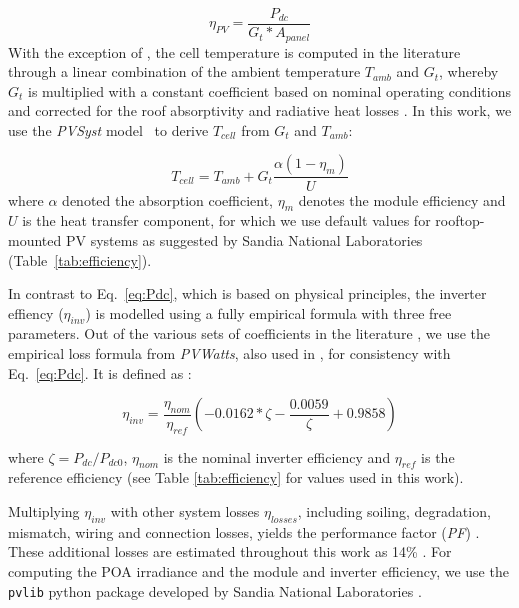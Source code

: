 \begin{equation}
\label{eq:eff}
    \eta_{PV} = \frac{P_{dc}}{G_{t} * A_\mathit{panel} }
\end{equation}
With the exception of \cite{calcabrini_simplified_2019}, the cell temperature is computed in the literature through a linear combination of the ambient temperature $T_\mathit{amb}$ and $G_t$, whereby $G_t$ is multiplied with a constant coefficient based on nominal operating conditions and corrected for the roof absorptivity and radiative heat losses \cite{jakubiec_method_2013}.
%
In this work, we use the \textit{PVSyst} model~\cite{faiman_assessing_2008} to derive $T_{cell}$ from $G_t$ and $T_\mathit{amb}$:

\begin{equation}
    T_\mathit{cell} = T_\mathit{amb} + G_t \frac{\alpha (1 - \eta_m)}{U}
\end{equation}
where $\alpha$ denoted the absorption coefficient, $\eta_m$ denotes the module efficiency and $U$ is the heat transfer component, for which we use default values for rooftop-mounted PV systems as suggested by Sandia National Laboratories \cite{holmgren_pvlib_2018} (Table~\ref{tab:efficiency}).

In contrast to Eq.~\ref{eq:Pdc}, which is based on physical principles, the inverter effiency ($\eta_\mathit{inv}$) is modelled using a fully empirical formula with three free parameters. Out of the various sets of coefficients in the literature \cite{mainzer_assessment_2017,lukac_buildings_2014}, we use the empirical loss formula from \textit{PVWatts}, also used in \cite{buffat_scalable_2018}, for consistency with Eq.~\ref{eq:Pdc}. It is defined as \cite{dobos_pvwatts_2014}:

\begin{equation}
\label{eq:inv}
    \eta_{inv} = \frac{\eta_{nom}}{\eta_{ref}} \left( -0.0162 * \zeta - \frac{0.0059}{\zeta} + 0.9858 \right)
\end{equation}

where $\zeta = P_{dc}/P_{dc0}$, $\eta_{nom}$ is the nominal inverter efficiency and $\eta_{ref}$ is the reference efficiency (see Table \ref{tab:efficiency} for values used in this work). 
%

Multiplying  $\eta_{inv}$ with other system losses $\eta_\mathit{losses}$, including soiling, degradation, mismatch, wiring and connection losses, yields the performance factor (\textit{PF}) \cite{klauser_solarpotentialanalyse_2016}. 
These additional losses are estimated throughout this work as 14\% \cite{dobos_pvwatts_2014}. For computing the POA irradiance and the module and inverter efficiency, we use the \texttt{pvlib} python package developed by Sandia National Laboratories \cite{holmgren_pvlib_2018}.

